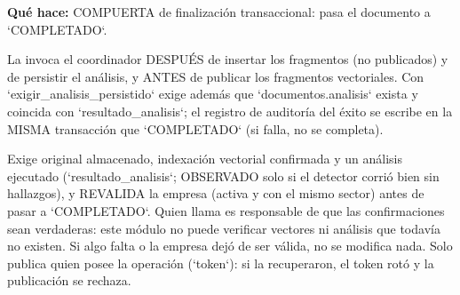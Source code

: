 \documentclass[11pt,a4paper]{article}
\begin{document}
\textbf{Qué hace:} COMPUERTA de finalización transaccional: pasa el documento a `COMPLETADO`.

La invoca el coordinador DESPUÉS de insertar los fragmentos (no publicados) y de persistir el
análisis, y ANTES de publicar los fragmentos vectoriales. Con `exigir\_analisis\_persistido` exige
además que `documentos.analisis` exista y coincida con `resultado\_analisis`; el registro de
auditoría del éxito se escribe en la MISMA transacción que `COMPLETADO` (si falla, no se completa).

Exige original almacenado, indexación vectorial confirmada y un análisis ejecutado
(`resultado\_analisis`; OBSERVADO solo si el detector corrió bien sin hallazgos), y
REVALIDA la empresa (activa y con el mismo sector) antes de pasar a `COMPLETADO`.
Quien llama es responsable de que las confirmaciones sean verdaderas: este módulo no
puede verificar vectores ni análisis que todavía no existen. Si algo falta o la
empresa dejó de ser válida, no se modifica nada. Solo publica quien posee la operación
(`token`): si la recuperaron, el token rotó y la publicación se rechaza.
\end{document}
